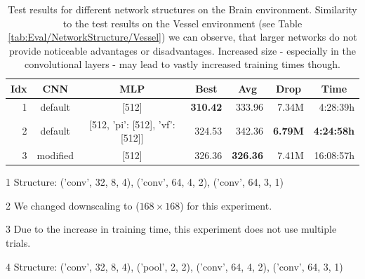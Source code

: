 \begin{table}[htp]
    \begin{center}
        \begin{threeparttable}
            \begin{tabular}{rccrrrr}
                \toprule
                \multicolumn{1}{c}{Idx} & \multicolumn{1}{c}{CNN} & \multicolumn{1}{c}{MLP} & \multicolumn{1}{c}{Best} & \multicolumn{1}{c}{Avg} & \multicolumn{1}{c}{Drop} & \multicolumn{1}{c}{Time}\\
                \midrule
                1 & default\tnote{1} & [512] & \textbf{310.42} & 333.96 & 7.34M & 4:28:39h \\
                2 & default\tnote{1} & [512, {'pi': [512], 'vf': [512]}] & 324.53 & 342.36 & \textbf{6.79M} & \textbf{4:24:58h} \\
                3\tnote{2,3} & modified\tnote{4} & [512] & 326.36 & \textbf{326.36} & 7.41M & 16:08:57h \\
                \bottomrule
            \end{tabular}
            \begin{tablenotes} \footnotesize
                \item[1] Structure: ('conv', 32, 8, 4), ('conv', 64, 4, 2), ('conv', 64, 3, 1)
                \item[2] We changed downscaling to ($168 \times 168$) for this experiment.
                \item[3] Due to the increase in training time, this experiment does not use multiple trials. 
                \item[4] Structure: ('conv', 32, 8, 4), ('pool', 2, 2), ('conv', 64, 4, 2), ('conv', 64, 3, 1)
            \end{tablenotes}
        \end{threeparttable}
    \end{center}
    \caption[Test Results for Different Network Structures on the Brain Environment]{Test results for different network structures on the Brain environment. Similarity to the test results on the Vessel environment (see Table \ref{tab:Eval/NetworkStructure/Vessel}) we can observe, that larger networks do not provide noticeable advantages or disadvantages. Increased size - especially in the convolutional layers - may lead to vastly increased training times though.} \label{tab:Eval/NetworkStructure/Brain}
\end{table}

